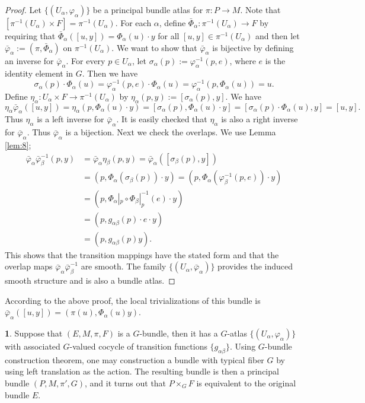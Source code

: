 \documentclass[11pt]{article}
\theoremstyle{definition}
\newtheorem{para}{}[part]
\theoremstyle{plain}
\begin{document}
\begin{proof}
	Let $\{(U_\alpha,\varphi_\alpha)\}$ be a principal bundle atlas for $\pi:P\to M$. Note that $[\pi^{-1}(U_\alpha)\times F]=\pi^{-1}(U_\alpha)$. For each $\alpha$, define $\bar{\Phi}_\alpha:\pi^{-1}(U_\alpha)\to F$ by requiring that $\bar{\Phi}_\alpha([u,y])=\Phi_\alpha(u)\cdot y$ for all $[u,y]\in \pi^{-1}(U_\alpha)$ and then let $\bar{\varphi}_\alpha:=(\pi,\bar{\Phi}_\alpha)$ on $\pi^{-1}(U_\alpha)$. We want to show that $\bar{\varphi}_\alpha$ is bijective by defining an inverse for $\bar{\varphi}_\alpha$. For every $p\in U_\alpha$, let $\sigma_\alpha(p):=\varphi_\alpha^{-1}(p,e)$, where $e$ is the identity element in $G$. Then we have
	\[
	\sigma_\alpha(p) \cdot \Phi_\alpha(u)=\varphi_\alpha^{-1}(p,e)\cdot \Phi_\alpha(u)=\varphi_\alpha^{-1}(p,\Phi_\alpha(u))=u.
	\]
	Define $\eta_\alpha:U_\alpha\times F\to \pi^{-1}(U_\alpha)$ by $\eta_{\alpha}(p,y):=[\sigma_\alpha(p),y]$. We have
	\[
	\eta_\alpha\bar{\varphi}_\alpha([u,y])=\eta_\alpha(p,\Phi_\alpha(u)\cdot y)=[\sigma_\alpha(p),\Phi_\alpha(u)\cdot y]=[\sigma_\alpha(p)\cdot \Phi_\alpha(u),y]=[u,y].
	\]
	Thus $\eta_\alpha$ is a left inverse for $\bar{\varphi}_{\alpha}$. It is easily checked that $\eta_\alpha$ is also a right inverse for $\bar{\varphi}_{\alpha}$. Thus $\bar{\varphi}_\alpha$ is a bijection. Next we check the overlaps. We use Lemma \ref{lem:8};
	\[
	\begin{aligned}
	\bar{\varphi}_{\alpha}\bar{\varphi}_{\beta}^{-1}(p,y)&=\bar{\varphi}_{\alpha}\eta_\beta(p,y)=\bar{\varphi}_{\alpha}([\sigma_\beta(p),y])\\
	&=(p,\Phi_\alpha(\sigma_\beta(p))\cdot y)=(p,\Phi_\alpha(\varphi_\beta^{-1}(p,e))\cdot y)\\
	&=(p,\Phi_\alpha|_p\circ \Phi_\beta|_p^{-1}(e)\cdot y)\\
	&=(p,g_{\alpha\beta}(p)\cdot e\cdot y)\\
	&=(p,g_{\alpha\beta}(p)y).
	\end{aligned}
	\]
	This shows that the transition mappings  have the stated form and that the overlap maps $\bar{\varphi}_{\alpha}\bar{\varphi}_{\beta}^{-1}$ are smooth. The family $\{(U_\alpha,\bar{\varphi}_\alpha)\}$ provides the induced smooth structure and is also a bundle atlas.
\end{proof}

According to the above proof, the local trivializations of this bundle is $\bar{\varphi}_\alpha([u,y])=(\pi(u),\Phi_\alpha(u)y)$.

\begin{para}\label{13}
	Suppose that $(E,M,\pi,F)$ is a $G$-bundle, then it has a $G$-atlas $\{(U_\alpha,\varphi_\alpha)\}$ with associated $G$-valued cocycle of transition functions $\{g_{\alpha\beta}\}$. Using $G$-bundle construction theorem, one may construction a bundle with typical fiber $G$ by using left translation as the action. The resulting bundle is then a principal bundle $(P,M,\pi',G)$, and it turns out that $P\times_G F$ is equivalent to the original bundle $E$.
\end{para}
\end{document}
